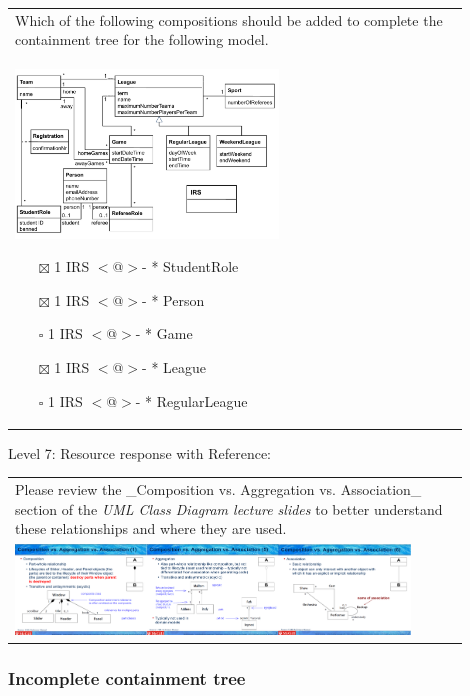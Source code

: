\begin{tabular}{|p{0.9\linewidth}}

Which of the following compositions should be added to complete the containment tree for the
following model.

\\
\includegraphics[width=0.6\textwidth]{images/IRS.png}

\begin{itemize}
    \item[$\boxtimes$] 1 IRS $<$@$>$- * StudentRole
    \item[$\boxtimes$] 1 IRS $<$@$>$- * Person
    \item[$\square$] 1 IRS $<$@$>$- * Game
    \item[$\boxtimes$] 1 IRS $<$@$>$- * League
    \item[$\square$] 1 IRS $<$@$>$- * RegularLeague
\end{itemize}

\end{tabular} \medskip

\noindent Level 7: Resource response with Reference: \medskip

\begin{tabular}{|p{0.9\linewidth}}
Please review the _Composition vs. Aggregation vs. Association_ section of 
the \textit{UML Class Diagram lecture slides} to 
better understand these relationships and where they are used.

\\
\includegraphics[width=0.9\textwidth]{images/composition_aggregation_association.png}
\end{tabular} \medskip


\subsubsection{Incomplete containment tree}

